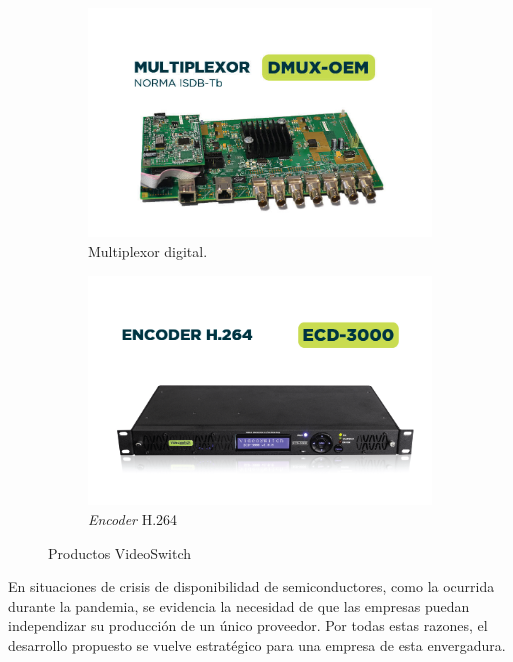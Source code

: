 \vspace{1cm}
\begin{figure}[htbp]
    \centering
    \begin{subfigure}{0.9\linewidth}
        \includegraphics[width=\linewidth]{./Figures/DMUX-OEM.jpg}
        \caption{Multiplexor digital.}
    \end{subfigure}
    \hspace{.05\linewidth}
    \begin{subfigure}{0.9\linewidth}
        \includegraphics[width=\linewidth]{./Figures/ECD-3000.png}
        \caption{\textit{Encoder} H.264}
    \end{subfigure}
    \caption{Productos VideoSwitch}\label{fig:vs-mux-ecd}
\end{figure}
\vspace{1cm}

En situaciones de crisis de disponibilidad de semiconductores, como la ocurrida
durante la pandemia, se evidencia la necesidad de que las empresas puedan
independizar su producción de un único proveedor. Por todas estas razones, el
desarrollo propuesto se vuelve estratégico para una empresa de esta envergadura.
